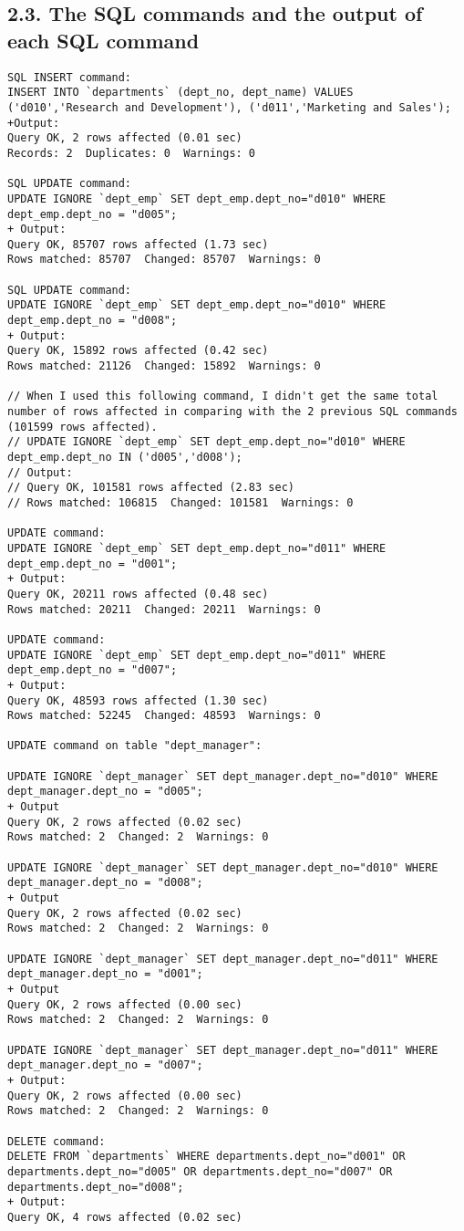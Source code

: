 \documentclass{report}
\begin{document}
\subsection*{2.3. The SQL commands and the output of each SQL command}
\begin{lstlisting}
SQL INSERT command: 
INSERT INTO `departments` (dept_no, dept_name) VALUES ('d010','Research and Development'), ('d011','Marketing and Sales');
+Output:
Query OK, 2 rows affected (0.01 sec)
Records: 2  Duplicates: 0  Warnings: 0

SQL UPDATE command: 
UPDATE IGNORE `dept_emp` SET dept_emp.dept_no="d010" WHERE dept_emp.dept_no = "d005";
+ Output:
Query OK, 85707 rows affected (1.73 sec)
Rows matched: 85707  Changed: 85707  Warnings: 0

SQL UPDATE command:
UPDATE IGNORE `dept_emp` SET dept_emp.dept_no="d010" WHERE dept_emp.dept_no = "d008";
+ Output:
Query OK, 15892 rows affected (0.42 sec)
Rows matched: 21126  Changed: 15892  Warnings: 0

// When I used this following command, I didn't get the same total number of rows affected in comparing with the 2 previous SQL commands (101599 rows affected).
// UPDATE IGNORE `dept_emp` SET dept_emp.dept_no="d010" WHERE dept_emp.dept_no IN ('d005','d008');
// Output:
// Query OK, 101581 rows affected (2.83 sec)
// Rows matched: 106815  Changed: 101581  Warnings: 0

UPDATE command:
UPDATE IGNORE `dept_emp` SET dept_emp.dept_no="d011" WHERE dept_emp.dept_no = "d001";
+ Output:
Query OK, 20211 rows affected (0.48 sec)
Rows matched: 20211  Changed: 20211  Warnings: 0

UPDATE command:
UPDATE IGNORE `dept_emp` SET dept_emp.dept_no="d011" WHERE dept_emp.dept_no = "d007";
+ Output:
Query OK, 48593 rows affected (1.30 sec)
Rows matched: 52245  Changed: 48593  Warnings: 0

UPDATE command on table "dept_manager":

UPDATE IGNORE `dept_manager` SET dept_manager.dept_no="d010" WHERE dept_manager.dept_no = "d005";
+ Output
Query OK, 2 rows affected (0.02 sec)
Rows matched: 2  Changed: 2  Warnings: 0

UPDATE IGNORE `dept_manager` SET dept_manager.dept_no="d010" WHERE dept_manager.dept_no = "d008";
+ Output
Query OK, 2 rows affected (0.02 sec)
Rows matched: 2  Changed: 2  Warnings: 0

UPDATE IGNORE `dept_manager` SET dept_manager.dept_no="d011" WHERE dept_manager.dept_no = "d001";
+ Output
Query OK, 2 rows affected (0.00 sec)
Rows matched: 2  Changed: 2  Warnings: 0

UPDATE IGNORE `dept_manager` SET dept_manager.dept_no="d011" WHERE dept_manager.dept_no = "d007";
+ Output:
Query OK, 2 rows affected (0.00 sec)
Rows matched: 2  Changed: 2  Warnings: 0

DELETE command:
DELETE FROM `departments` WHERE departments.dept_no="d001" OR departments.dept_no="d005" OR departments.dept_no="d007" OR departments.dept_no="d008";
+ Output:
Query OK, 4 rows affected (0.02 sec)

\end{lstlisting}
\end{document}
